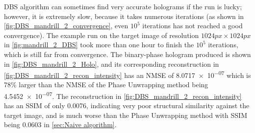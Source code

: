 DBS algorithm can sometimes find very accurate holograms if the run is lucky; however, it is extremely slow, because it takes numerous iterations (as shown in \cref{fig:DBS_mandrill_2_convergence}, even $10^5$ iterations has not reached a good convergence). The example run on the target image of resolution $1024 px\times 1024 px$ in \cref{fig:mandrill_2_DBS} took more than one hour to finish the $10^5$ iterations, which is still far from convergence. The binary-phase hologram produced is shown in \cref{fig:DBS_mandrill_2_Holo}, and its corresponding reconstruction in \cref{fig:DBS_mandrill_2_recon_intensity} has an NMSE of \num{8.0717e-07} which is 78\% larger than the NMSE of the Phase Unwrapping method being \num{4.5452e-07}. The reconstruction in \cref{fig:DBS_mandrill_2_recon_intensity} has an SSIM of only 0.0076, indicating very poor structural similarity against the target image, and is much worse than the Phase Unwrapping method with SSIM being 0.0603 in \cref{sec:Naive algorithm}.

